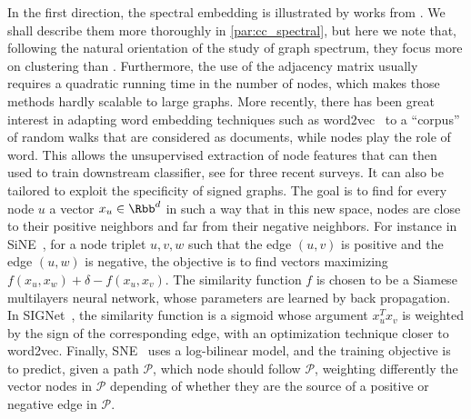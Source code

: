 In the first direction, the spectral embedding is illustrated by works from
\textcites{Kunegis2009}{SignedEmbedding15}. We shall describe them more thoroughly in
\autoref{par:cc_spectral}, but here we note that, following the natural orientation of the study of
graph spectrum, they focus more on clustering than \esp{}. Furthermore, the
use of the adjacency matrix usually requires a quadratic running time in the number of nodes, which
makes those methods hardly scalable to large graphs. More recently, there has been great interest in
adapting word embedding techniques such as \textsf{word2vec}~\autocite{word2vec13} to a
\enquote{corpus} of random walks that are considered as documents, while nodes play the role of
word. This allows the unsupervised extraction of node features that can then used to train
downstream classifier, see
\autocites{nodeEmbeddingsurvey16}{representationLearning17}{graphEmbeddingSurvey17} for three recent
surveys. It can also be
tailored to exploit the specificity of signed graphs.
The goal is to find for every node $u$ a vector $x_u\in\Rbb^d$ in such a way that in this new space,
nodes are close to their positive neighbors and far from their negative neighbors. For instance in
SiNE~\autocite{neuralSigned17}, for a node triplet $u,v,w$ such that the edge $(u,v)$ is positive
and the edge $(u,w)$ is negative, the objective is to find vectors maximizing $f(x_u, x_w) + \delta
- f(x_u, x_v)$. The similarity function $f$ is chosen to be a Siamese multilayers neural network,
whose parameters are learned by back propagation. In SIGNet~\autocite{SIGNet17}, the similarity
function is a sigmoid whose argument $x_u^Tx_v$ is weighted by the sign of the corresponding edge,
with an optimization technique closer to \textsf{word2vec}. Finally, SNE~\autocite{SNE17} uses a
log-bilinear model, and the training objective is to predict, given a path $\mathcal{P}$, which node
should follow $\mathcal{P}$, weighting differently the vector nodes in $\mathcal{P}$ depending of
whether they are the source of a positive or negative edge in $\mathcal{P}$.

\medskip

